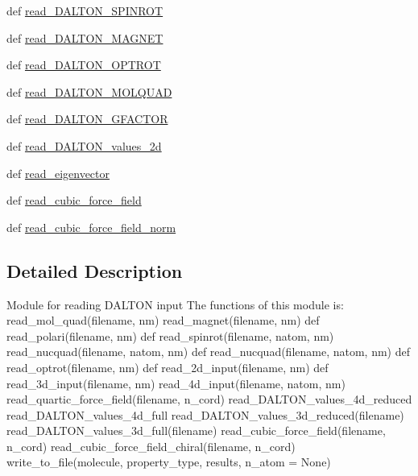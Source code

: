 \begin{DoxyCompactItemize}
\item 
def \hyperlink{namespaceread__input_a8aac5eef6151620e5716d052619dcdb4}{read\+\_\+\+D\+A\+L\+T\+O\+N\+\_\+\+S\+P\+I\+N\+R\+O\+T}
\item 
def \hyperlink{namespaceread__input_a369e35f499980d6f1fcc4f124a51853f}{read\+\_\+\+D\+A\+L\+T\+O\+N\+\_\+\+M\+A\+G\+N\+E\+T}
\item 
def \hyperlink{namespaceread__input_a6d481af39bac4e74210d7642c28818f9}{read\+\_\+\+D\+A\+L\+T\+O\+N\+\_\+\+O\+P\+T\+R\+O\+T}
\item 
def \hyperlink{namespaceread__input_a4153675abaf286f3d11e512f94f34c09}{read\+\_\+\+D\+A\+L\+T\+O\+N\+\_\+\+M\+O\+L\+Q\+U\+A\+D}
\item 
def \hyperlink{namespaceread__input_a88426418b4a30aa753d100056caeafd8}{read\+\_\+\+D\+A\+L\+T\+O\+N\+\_\+\+G\+F\+A\+C\+T\+O\+R}
\item 
def \hyperlink{namespaceread__input_a72d36f819fad47c5bf4da371d5d6190b}{read\+\_\+\+D\+A\+L\+T\+O\+N\+\_\+values\+\_\+2d}
\item 
def \hyperlink{namespaceread__input_a22bdcbd1e0b1955aefb4d4293092c060}{read\+\_\+eigenvector}
\item 
def \hyperlink{namespaceread__input_a71ccfa788319e09d446f5db99175fe0c}{read\+\_\+cubic\+\_\+force\+\_\+field}
\item 
def \hyperlink{namespaceread__input_a322e6108f22b89d25da80c4cbe60272a}{read\+\_\+cubic\+\_\+force\+\_\+field\+\_\+norm}
\end{DoxyCompactItemize}


\subsection{Detailed Description}
\begin{DoxyVerb}Module for reading DALTON input  
The functions of this module is:
read_mol_quad(filename, nm)
read_magnet(filename, nm)
def read_polari(filename, nm)
def read_spinrot(filename, natom, nm)
read_nucquad(filename, natom, nm)
def read_nucquad(filename, natom, nm)
def read_optrot(filename, nm)
def read_2d_input(filename, nm)
def read_3d_input(filename, nm)
read_4d_input(filename, natom, nm)
read_quartic_force_field(filename, n_cord)
read_DALTON_values_4d_reduced
read_DALTON_values_4d_full
read_DALTON_values_3d_reduced(filename)
read_DALTON_values_3d_full(filename)
read_cubic_force_field(filename, n_cord)
read_cubic_force_field_chiral(filename, n_cord)
write_to_file(molecule, property_type, results, n_atom = None)
\end{DoxyVerb}
 

